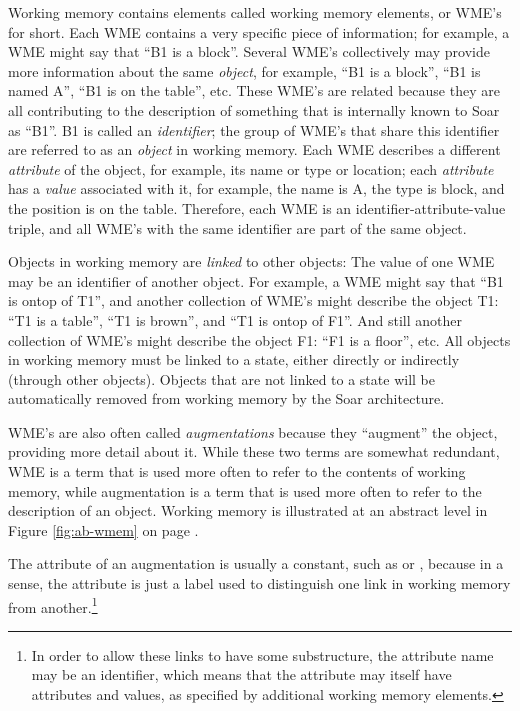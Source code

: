 Working memory contains elements called working memory elements, or WME's for
short. Each WME contains a very specific piece of information; for example, a WME
might say that ``B1 is a block''. 
Several WME's collectively may provide more information about the same
\textit{object}, for example, ``B1 is a block'', ``B1 is named A'', ``B1 is on
the table'', etc. These WME's are related because they are all contributing to
the description of something that is internally known to Soar as ``B1''. B1 is
called an \textit{identifier}; the group of WME's that share this identifier
are referred to as an \textit{object} in working memory. 
Each WME describes a different \textit{attribute} of the object, for example,
its name or type or location; each \textit{attribute} has a \textit{value} associated
with it, for example, the name is A, the type is block, and the position is on
the table. Therefore, each WME is an identifier-attribute-value triple, and
all WME's with the same identifier are part of the same object.

Objects in working memory are \emph{linked} to other objects: The value of one
WME may be an identifier of another object. For example, a WME might say that
``B1 is ontop of T1'', and another collection of WME's might describe the
object T1: ``T1 is a table'', ``T1 is brown'', and ``T1 is ontop of F1''. And
still another collection of WME's might describe the object F1: ``F1 is a
floor'', etc. All objects in working memory must be linked to a state, either
directly or indirectly (through other objects). Objects that are not linked to
a state will be automatically removed from working memory by the Soar
architecture. 

WME's are also often called \textit{augmentations} because they
``augment'' the object, providing more detail about it. While these two
terms are somewhat redundant, WME is a term that is used more often to
refer to the contents of working memory, while augmentation is a term
that is used more often to refer to the description of an object.
Working memory is illustrated at an abstract level in Figure
\ref{fig:ab-wmem} on page \pageref{fig:ab-wmem}. 


The attribute of an augmentation is usually a constant, such as  or
, because in a sense, the attribute is just a label used to
distinguish one link in working memory from another.\footnote{In order to
allow these links to have some substructure, the attribute name may be an
identifier, which means that the attribute may itself have attributes and
values, as specified by additional working memory elements.}

